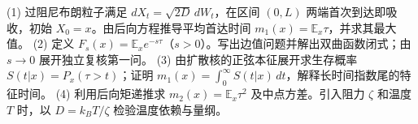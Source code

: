 (1) 过阻尼布朗粒子满足 \(dX_t=\sqrt{2D}\,dW_t\)，在区间 \((0,L)\) 两端首次到达即吸收，初始 \(X_0=x\)。由后向方程推导平均首达时间 \(m_1(x)=\mathbb E_x\tau\)，并求其最大值。
(2) 定义 \(F_s(x)=\mathbb E_x e^{-s\tau}\)（\(s>0\)）。写出边值问题并解出双曲函数闭式；由 \(s\to0\) 展开独立复核第一问。
(3) 由扩散核的正弦本征展开求生存概率 \(S(t|x)=P_x(\tau>t)\)；证明 \(m_1(x)=\int_0^\infty S(t|x)\,dt\)，解释长时间指数尾的特征时间。
(4) 利用后向矩递推求 \(m_2(x)=\mathbb E_x\tau^2\) 及中点方差。引入阻力 \(\zeta\) 和温度 \(T\) 时，以 \(D=k_BT/\zeta\) 检验温度依赖与量纲。
